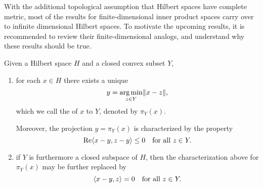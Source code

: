 With the additional topological assumption that Hilbert spaces have complete metric, most of the results for finite-dimensional inner product spaces carry over to infinite dimensional Hilbert spaces. To motivate the upcoming results, it is recommended to review their finite-dimensional analogs, and understand why these results should be true.

\begin{namedthm} \label{thm:proj-Hilbert} Given a Hilbert space $H$ and a closed convex subset $Y$,
\begin{enumerate} 
    \item for each $x \in H$ there exists a unique \[
        y = \operatorname*{arg\,min}_{z \in Y} \lVert x - z \rVert,
    \] which we call the  of $x$ to $Y$, denoted by $\pi_Y(x)$.

    Moreover, the projection $y = \pi_Y(x)$ is characterized by the property \begin{equation} \label{eq:proj-cc-set-char}
        \Re \inp{x - y}{z - y} \leq 0\quad\text{for all }z\in Y.
    \end{equation}
    \item if $Y$ is furthermore a closed subspace of $H$, then the characterization above for $\pi_Y(x)$ may be further replaced by \begin{equation} \label{eq:proj-closed-sub-char}
        \inp{x- y}{z} = 0\quad \text{for all }z\in Y.
    \end{equation}
\end{enumerate}
\end{namedthm}
